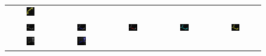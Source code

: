 \begin{figure}[t]
\begin{tabular}{@{}ccccc@{}}
\includegraphics[width=0.19\textwidth]{images/L2S_compare_region/dendrites2_ours}	
\\
\includegraphics[width=0.19\textwidth]{images/L2S_compare_region/n13_orig}	&
\includegraphics[width=0.19\textwidth]{images/L2S_compare_region/n13_CV}	&
\includegraphics[width=0.19\textwidth]{images/L2S_compare_region/n13_Lankton} &
\includegraphics[width=0.19\textwidth]{images/L2S_compare_region/n13_Li}	&
\includegraphics[width=0.19\textwidth]{images/L2S_compare_region/n13_ours}	
\\
\includegraphics[width=0.19\textwidth]{images/L2S_compare_region/neuron_clear_orig}	&
\includegraphics[width=0.19\textwidth]{images/L2S_compare_region/neuron_clear_CV}	&

\end{tabular}
\end{figure}
